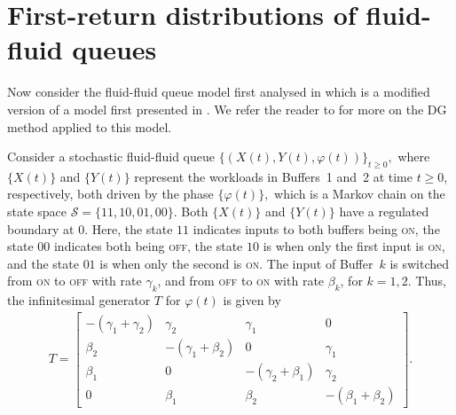 \section{First-return distributions of fluid-fluid queues}\label{sec: ffq num}
Now consider the fluid-fluid queue model first analysed in \cite{blnos2022} which is a modified version of a model first presented in \cite{lnp13}. We refer the reader to \cite{blnos2022} for more on the DG method applied to this model. 
\begin{model}\label{model: ffq}
	Consider a stochastic fluid-fluid queue $\{(X(t),Y(t),\varphi(t))\}_{t\geq0},$ where $\{X(t)\}$ and $\{Y(t)\}$ represent the workloads in Buffers~1 and~2 at time $t \geq 0$, respectively, both driven by the phase $\{\varphi(t)\},$ which is a Markov chain on the state space $\mathcal{S} = \{11,10,01,00\}$. Both $\{X(t)\}$ and $\{Y(t)\}$ have a regulated boundary at 0. Here, the state $11$ indicates inputs to both buffers being \textnormal{\textsc{on}}, the state $00$ indicates both being \textnormal{\textsc{off}}, the state $10$ is when only the first input is \textnormal{\textsc{on}}, and the state $01$ is when only the second is \textnormal{\textsc{on}}. The input of Buffer~$k$ is switched from \textnormal{\textsc{on}} to \textnormal{\textsc{off}} with rate $\gamma_k$, and from \textnormal{\textsc{off}} to \textnormal{\textsc{on}} with rate $\beta_k$, for $k = 1, 2$. Thus, the infinitesimal generator $T$ for $\varphi(t)$ is given by 
	\begin{align*} 
		T = \left[ \begin{array}{cccc} -(\gamma_1 + \gamma_2) & \gamma_2 & \gamma_1 & 0 \\
							\beta_2 & -(\gamma_1 + \beta_2) & 0 & \gamma_1 \\
							\beta_1 & 0 & -(\gamma_2 + \beta_1) & \gamma_2 \\
							0 & \beta_1 &\beta_2 &-(\beta_1 + \beta_2)
	\end{array}\right].
	\end{align*} 


\end{model}
